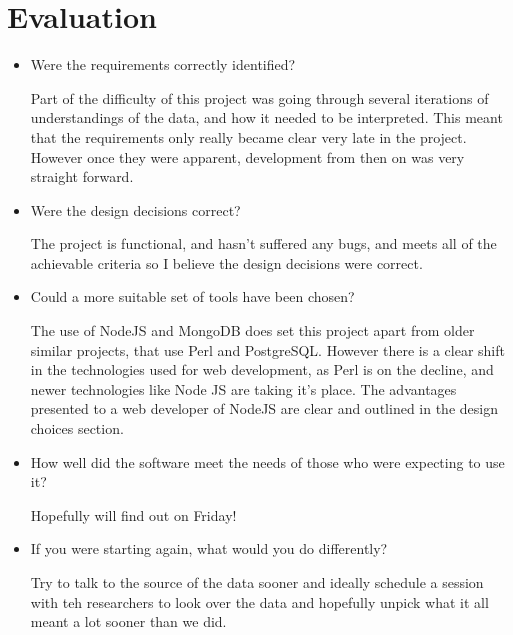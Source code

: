 \chapter{Evaluation}


\begin{itemize}
   \item Were the requirements correctly identified? 

     Part of the difficulty of this project was going through several iterations of understandings of the data, and how it needed to be interpreted. This meant that the requirements only really became clear very late in the project. However once they were apparent, development from then on was very straight forward. 

   \item Were the design decisions correct?

     The project is functional, and hasn't suffered any bugs, and meets all of the achievable criteria so I believe the design decisions were correct.

   \item Could a more suitable set of tools have been chosen?

     The use of NodeJS and MongoDB does set this project apart from older similar projects, that use Perl and PostgreSQL. However there is a clear shift in the technologies used for web development, as Perl is on the decline\cite{needed}, and newer technologies like Node JS are taking it's place. The advantages presented to a web developer of NodeJS are clear and outlined in the design choices section. 

   \item How well did the software meet the needs of those who were expecting to use it?

     Hopefully will find out on Friday!

   \item If you were starting again, what would you do differently?

     Try to talk to the source of the data sooner and ideally schedule a session with teh researchers to look over the data and hopefully unpick what it all meant a lot sooner than we did. 
\end{itemize}



